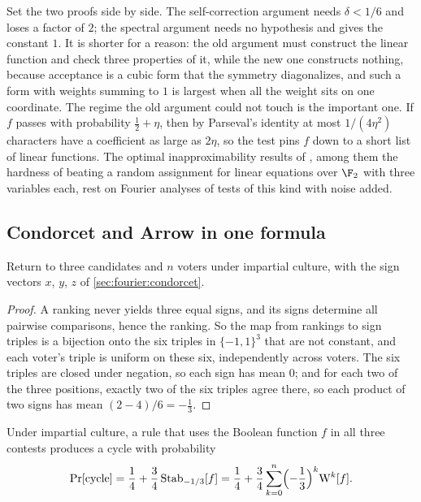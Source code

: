 \begin{refsection}
Set the two proofs side by side. The self-correction argument needs $\delta<1/6$ and loses a factor of $2$; the spectral argument needs no hypothesis and gives the constant $1$. It is shorter for a reason: the old argument must construct the linear function and check three properties of it, while the new one constructs nothing, because acceptance is a cubic form that the symmetry diagonalizes, and such a form with weights summing to $1$ is largest when all the weight sits on one coordinate. The regime the old argument could not touch is the important one. If $f$ passes with probability $\frac12+\eta$, then by Parseval's identity at most $1/(4\eta^2)$ characters have a coefficient as large as $2\eta$, so the test pins $f$ down to a short list of linear functions. The optimal inapproximability results of \textcite{Hastad2001}, among them the hardness of beating a random assignment for linear equations over $\F_2$ with three variables each, rest on Fourier analyses of tests of this kind with noise added.

\subsection{Condorcet and Arrow in one formula}\label{sec:fourier:kalai}

Return to three candidates and $n$ voters under impartial culture, with the sign vectors $x$, $y$, $z$ of \cref{sec:fourier:condorcet}.


\begin{proof}
A ranking never yields three equal signs, and its signs determine all pairwise comparisons, hence the ranking. So the map from rankings to sign triples is a bijection onto the six triples in $\{-1,1\}^3$ that are not constant, and each voter's triple is uniform on these six, independently across voters. The six triples are closed under negation, so each sign has mean $0$; and for each two of the three positions, exactly two of the six triples agree there, so each product of two signs has mean $(2-4)/6=-\frac13$.
\end{proof}

\begin{theorem}\label{thm:fourier:kalai}
Under impartial culture, a rule that uses the Boolean function $f$ in all three contests produces a cycle with probability
\begin{equation}\label{eq:fourier:kalai}
  \Pr[\text{cycle}]=\frac14+\frac34\operatorname{Stab}_{-1/3}[f]=\frac14+\frac34\sum_{k=0}^n\Bigl(-\frac13\Bigr)^k\mathrm{W}^{k}[f].
\end{equation}
\end{theorem}


\end{refsection}
